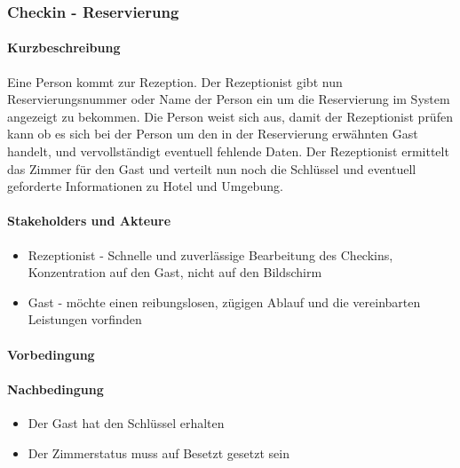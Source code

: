 \subsubsection{Checkin - Reservierung}
\label{UseCase_CheckinReservierung}

\paragraph{Kurzbeschreibung}
Eine Person kommt zur \Gls{Rezeption}. Der \Gls{Rezeptionist} gibt nun \Gls{Reservierungsnummer} oder Name der Person ein um die \Gls{Reservierung} im System angezeigt zu bekommen. Die Person weist sich aus, damit der \Gls{Rezeptionist} prüfen kann ob es sich bei der Person um den in der Reservierung erwähnten \Gls{Gast} handelt, und vervollständigt eventuell fehlende Daten. Der \Gls{Rezeptionist} ermittelt das \Gls{Zimmer} für den \Gls{Gast} und verteilt nun noch die Schlüssel und eventuell geforderte Informationen zu Hotel und Umgebung.

\paragraph{Stakeholders und Akteure}
\begin{itemize}
	\item \Gls{Rezeptionist} - Schnelle und zuverlässige Bearbeitung des \Gls{Checkin}s, Konzentration auf den \Gls{Gast}, nicht auf den Bildschirm
	\item \Gls{Gast} - möchte einen reibungslosen, zügigen Ablauf und die vereinbarten Leistungen vorfinden
\end{itemize}

\paragraph{Vorbedingung}

\paragraph{Nachbedingung}
\begin{itemize}
	\item Der Gast hat den Schlüssel erhalten
	\item Der Zimmerstatus muss auf Besetzt gesetzt sein
\end{itemize}
